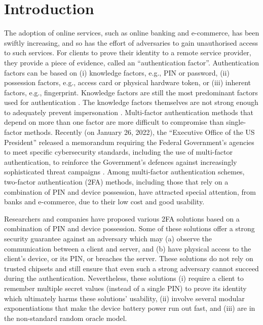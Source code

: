 


\section{Introduction}

The adoption of online services, such as online banking and e-commerce, has been swiftly increasing, and so has the effort of adversaries to gain unauthorised access to such services.  For clients to prove their identity to a remote service provider, they provide a piece of evidence, called an ``authentication factor''. Authentication factors can be based on (i) knowledge factors, e.g., PIN or password, (ii)  possession factors, e.g., access card or physical hardware token, or (iii) inherent factors, e.g., fingerprint.  
%
Knowledge factors are still the most predominant factors used for authentication \cite{bonneau2010password,JacommeK21}. 
%
%
 The knowledge factors themselves are not strong enough to adequately prevent impersonation 
 \cite{SinigagliaCCZ20,JacommeK21}.  Multi-factor authentication methods that depend on more than one factor are more difficult to compromise than single-factor methods. Recently (on January 26, 2022), the ``Executive Office of the US President'' released a memorandum requiring
the Federal Government's agencies to meet specific cybersecurity standards, including the use of multi-factor authentication, to reinforce the Government’s defences against increasingly sophisticated threat campaigns \cite{Zero-Trust-Cybersecurity}. 
% 
Among multi-factor authentication schemes, two-factor authentication (2FA) methods, including those that rely on a combination of PIN and device possession, have attracted special attention, from banks and e-commerce, due to their low cost and good usability. %
%


Researchers and companies have proposed various 2FA solutions based on a combination of PIN and device possession. Some of these solutions offer a strong security guarantee against an adversary which may (a) observe the communication between a client and server, and (b) have physical access to the client's device, or its PIN, or breaches the server. These solutions do not rely on trusted chipsets and still ensure that even such a strong adversary cannot succeed during the authentication. Nevertheless, these solutions (i) require a client to remember multiple secret values (instead of a single PIN)  to prove its identity which ultimately harms these solutions' usability, (ii) involve several modular exponentiations that make the device battery power run out fast, and (iii) are in the non-standard random oracle model. 


